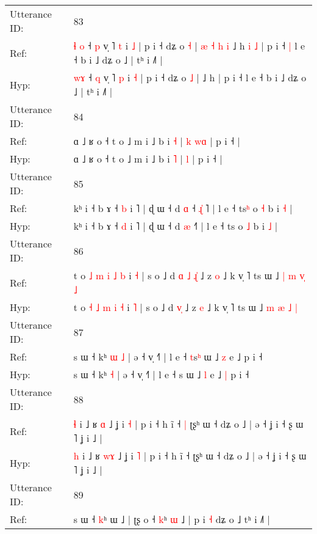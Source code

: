 \documentclass[10pt]{article}
\DeclareRobustCommand{\hl}[1]{{\textcolor{red}{#1}}}
\begin{document}
\begin{longtable}{ll}
 \\
\midrule
Utterance ID: & 83 \\
Ref: & \hl{ɬ}\hl{ }\hl{o} ˧ \hl{p} v̩ ˥ \hl{t} i \hl{˩} | p i ˧ dʑ o \hl{˧} |\hl{ }\hl{æ}\hl{ }\hl{˧}\hl{ }\hl{h}\hl{ }\hl{i} ˩ h\hl{ }\hl{i}\hl{ }\hl{˩} | p i ˧\hl{ }\hl{|} l e ˧ b i ˩ dʑ o ˩ | tʰ i ˩˥ |
 \\
Hyp: & \hl{}\hl{w}\hl{ɤ} ˧ \hl{q} v̩ ˥ \hl{p} i \hl{˧} | p i ˧ dʑ o \hl{˩} |\hl{}\hl{}\hl{}\hl{}\hl{}\hl{}\hl{}\hl{} ˩ h\hl{}\hl{}\hl{}\hl{} | p i ˧\hl{}\hl{} l e ˧ b i ˩ dʑ o ˩ | tʰ i ˩˥ |
 \\
\midrule
Utterance ID: & 84 \\
Ref: & ɑ ˩ ʁ o ˧ t o ˩ m i ˩ b i \hl{˧} |\hl{ }\hl{k} \hl{w}\hl{ɑ} | p i ˧ |
 \\
Hyp: & ɑ ˩ ʁ o ˧ t o ˩ m i ˩ b i \hl{˥} |\hl{}\hl{} \hl{}\hl{l} | p i ˧ |
 \\
\midrule
Utterance ID: & 85 \\
Ref: & kʰ i ˧ b ɤ ˧ \hl{b} i ˥ | ɖ ɯ ˧ d \hl{ɑ} ˧\hl{ }\hl{ɻ}\hl{̍}\hl{ }˥ | l e ˧ ts\hl{ʰ} o \hl{˧} b i \hl{˧} |
 \\
Hyp: & kʰ i ˧ b ɤ ˧ \hl{d} i ˥ | ɖ ɯ ˧ d \hl{æ} ˧\hl{}\hl{}\hl{}\hl{}˥ | l e ˧ ts\hl{} o \hl{˩} b i \hl{˩} |
 \\
\midrule
Utterance ID: & 86 \\
Ref: & t o \hl{˩} \hl{m} \hl{i} \hl{˩} \hl{b} i \hl{˧} | s o ˩ d\hl{ }\hl{ɑ}\hl{ }\hl{˩} \hl{ɻ}\hl{̍} ˩ z \hl{o} ˩ k v̩ ˥ ts ɯ ˩ \hl{|} \hl{m} \hl{v}\hl{̩} \hl{˩}
 \\
Hyp: & t o \hl{˧} \hl{˩} \hl{m} \hl{i} \hl{˧} i \hl{˥} | s o ˩ d\hl{}\hl{}\hl{}\hl{} \hl{v}\hl{̩} ˩ z \hl{e} ˩ k v̩ ˥ ts ɯ ˩ \hl{m} \hl{æ} \hl{}\hl{˩} \hl{|}
 \\
\midrule
Utterance ID: & 87 \\
Ref: & s ɯ ˧ kʰ\hl{ }\hl{ɯ} \hl{˩} | ə ˧ v̩ ˧˥ | l e ˧ \hl{t}s\hl{ʰ} ɯ ˩ \hl{z} e ˩\hl{}\hl{} p i ˧
 \\
Hyp: & s ɯ ˧ kʰ\hl{}\hl{} \hl{˧} | ə ˧ v̩ ˧˥ | l e ˧ \hl{}s\hl{} ɯ ˩ \hl{l} e ˩\hl{ }\hl{|} p i ˧
 \\
\midrule
Utterance ID: & 88 \\
Ref: & \hl{ɬ} i ˩ ʁ \hl{}\hl{ɑ} ˩ ʝ i \hl{˧} | p i ˧ h ĩ ˧\hl{ }\hl{|} ʈʂʰ ɯ ˧ dʑ o ˩ | ə ˧ ʝ i ˧ ʂ ɯ ˥ ʝ i ˩ |
 \\
Hyp: & \hl{h} i ˩ ʁ \hl{w}\hl{ɤ} ˩ ʝ i \hl{˥} | p i ˧ h ĩ ˧\hl{}\hl{} ʈʂʰ ɯ ˧ dʑ o ˩ | ə ˧ ʝ i ˧ ʂ ɯ ˥ ʝ i ˩ |
 \\
\midrule
Utterance ID: & 89 \\
Ref: & s ɯ ˧ \hl{}\hl{k}ʰ ɯ ˩ | ʈʂ o ˧ \hl{k}ʰ\hl{ }\hl{ɯ} ˩ | p i \hl{˧} dʑ o ˩\hl{}\hl{} tʰ i ˩˥ |

\end{longtable}
\end{document}
